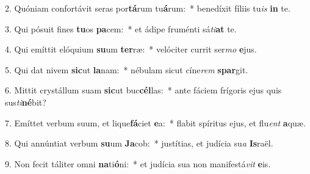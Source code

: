 2. Quóniam confortávit seras por\textbf{tá}rum tu\textbf{á}rum:~*  benedíxit fíliis tu\textit{is} \textbf{in} te.\

3. Qui pósuit fines \textbf{tu}os \textbf{pa}cem:~*  et ádipe fruménti sá\textit{ti}\textbf{at} te.\

4. Qui emíttit elóquium \textbf{su}um \textbf{ter}ræ:~*  velóciter currit ser\textit{mo} \textbf{e}jus.\

5. Qui dat nivem \textbf{sic}ut \textbf{la}nam:~*  nébulam sicut cíne\textit{rem} \textbf{spar}git.\

6. Mittit crystállum suam \textbf{sic}ut buc\textbf{cél}las:~*  ante fáciem frígoris ejus quis sus\textit{ti}\textbf{né}bit?\

7. Emíttet verbum suum, et lique\textbf{fá}ciet \textbf{e}a:~*  flabit spíritus ejus, et flu\textit{ent} \textbf{a}quæ.\

8. Qui annúntiat verbum \textbf{su}um \textbf{Ja}cob:~*  justítias, et judícia su\textit{a} \textbf{Is}raël.\

9. Non fecit táliter omni \textbf{na}ti\textbf{ó}ni:~*  et judícia sua non manifestá\textit{vit} \textbf{e}is.\

